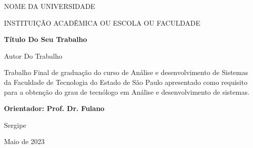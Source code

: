\documentclass[a4paper,12pt]{article}
\begin{document}
\begin{titlepage}
	\addtolength{\topmargin}{1.5cm} %
	\setlength{\baselineskip}{1.4\baselineskip} %
	
	\begin{center}
		{\large{NOME DA UNIVERSIDADE}}
		
		{\large{INSTITUIÇÃO ACADÊMICA OU ESCOLA OU FACULDADE}}
	\end{center}

	\vspace{2cm}
	
	\begin{center}
		{\Large{\textbf{Título Do Seu Trabalho}}}
	\end{center}		
	
	\vspace{1.5cm}
	
	\begin{center}
		{\Large{Autor Do Trabalho}}
	\end{center}
	
	\vspace{2cm}
	
	\begin{flushright}
		\begin{minipage}[t]{12cm}
			\hrulefill
	
				Trabalho Final de graduação do curso de Análise e desenvolvimento de 	Sistemas da Faculdade de Tecnologia do Estado de São Paulo apresentado como requisito para a obtenção do grau de tecnólogo em Análise e desenvolvimento de sistemas.

			\hrulefill
			
			\vspace{0.2cm}
			
			{\bf Orientador: Prof. Dr. Fulano}
		\end{minipage}
	\end{flushright}
	\setlength{\baselineskip}{0.7\baselineskip}
	\vfill %

	\begin{center}
		Sergipe
		
		Maio de 2023
	\end{center}
	
\end{titlepage}
\end{document}
